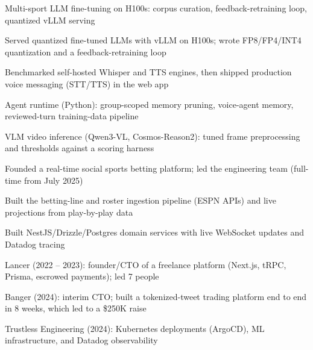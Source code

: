 \documentclass[print]{jack-resume}
\begin{document}
\begin{tightemize}
    \item Multi-sport LLM fine-tuning on H100s: corpus curation, feedback-retraining loop, quantized vLLM serving
    \item Served quantized fine-tuned LLMs with vLLM on H100s; wrote FP8/FP4/INT4 quantization and a feedback-retraining loop
    \item Benchmarked self-hosted Whisper and TTS engines, then shipped production voice messaging (STT/TTS) in the web app
    \item Agent runtime (Python): group-scoped memory pruning, voice-agent memory, reviewed-turn training-data pipeline
    \item VLM video inference (Qwen3-VL, Cosmos-Reason2): tuned frame preprocessing and thresholds against a scoring harness
\end{tightemize}
\sectionsep

\begin{tightemize}
    \item Founded a real-time social sports betting platform; led the engineering team (full-time from July 2025)
    \item Built the betting-line and roster ingestion pipeline (ESPN APIs) and live projections from play-by-play data
    \item Built NestJS/Drizzle/Postgres domain services with live WebSocket updates and Datadog tracing
\end{tightemize}
\sectionsep

\begin{tightemize}
    \item Lancer (2022 -- 2023): founder/CTO of a freelance platform (Next.js, tRPC, Prisma, escrowed payments); led 7 people
    \item Banger (2024): interim CTO; built a tokenized-tweet trading platform end to end in 8 weeks, which led to a \$250K raise
    \item Trustless Engineering (2024): Kubernetes deployments (ArgoCD), ML infrastructure, and Datadog observability
\end{tightemize}
\sectionsep
\end{document}
